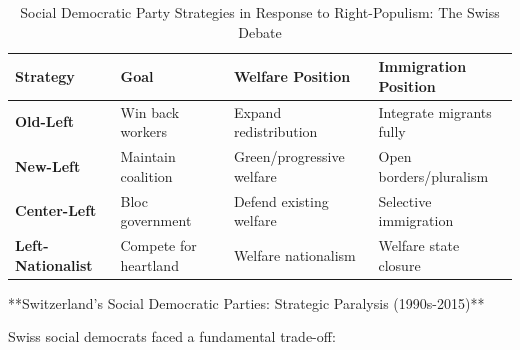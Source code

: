 \begin{table}[h]
\centering
\caption{Social Democratic Party Strategies in Response to Right-Populism: The Swiss Debate}
\label{tab:sdp-strategies-swiss}
\small
\begin{tabular}{llll}
\toprule
\textbf{Strategy} & \textbf{Goal} & \textbf{Welfare Position} & \textbf{Immigration Position} \\
\midrule
\textbf{Old-Left} & Win back workers & Expand redistribution & Integrate migrants fully \\
\textbf{New-Left} & Maintain coalition & Green/progressive welfare & Open borders/pluralism \\
\textbf{Center-Left} & Bloc government & Defend existing welfare & Selective immigration \\
\textbf{Left-Nationalist} & Compete for heartland & Welfare nationalism & Welfare state closure \\
\bottomrule
\end{tabular}
\end{table}

**Switzerland's Social Democratic Parties: Strategic Paralysis (1990s-2015)**

Swiss social democrats faced a fundamental trade-off:

